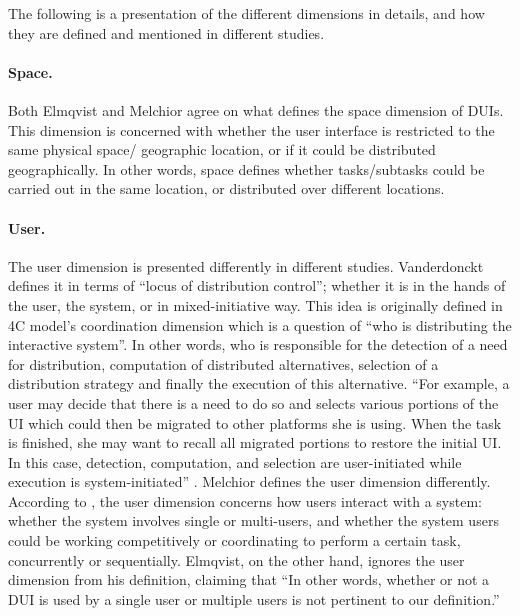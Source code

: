 The following is a presentation of the different dimensions in details, and
how they are defined and mentioned in different studies.
\paragraph{Space.}  Both Elmqvist \cite{elmqvist2011distributed} and Melchior
\cite{melchior2011distributed} agree on what defines the space  dimension of
DUIs. This dimension is concerned with whether the user interface is
restricted to the same physical space/ geographic location, or if it could be
distributed geographically. In other words, space defines whether tasks/subtasks
could be carried out in the same location, or distributed over different
locations. 

\paragraph{User.} The user dimension is presented differently in different
studies. Vanderdonckt \cite{vanderdonckt2010distributed} defines it in terms of 
``locus of distribution control''; whether it is in the hands of the user, the
system, or in mixed-initiative way. This idea is originally defined in 4C
model's coordination dimension which is a question of ``who is distributing the interactive system''\cite{demeure20084c}.
In other words, who is responsible for the detection of a need for distribution,
computation of distributed alternatives, selection of a distribution strategy and
finally the execution of this alternative. ``For example, a user may decide
that there is a need to do so and selects various portions of the UI which could
then be migrated to other platforms she is using. When the task is finished, she
may want to recall all migrated portions to restore the initial UI. In this
case, detection, computation, and selection are user-initiated while execution
is system-initiated'' \cite{demeure20084c}. Melchior defines the user dimension
differently. According to \cite{melchior2011distributed}, the user dimension concerns how users interact
with a system: whether the system involves single or multi-users, and whether
the system users could be working competitively or coordinating to perform a
certain task, concurrently or sequentially. Elmqvist, on the other hand, ignores
the user dimension from his definition, claiming that ``In other words, whether or not a DUI is used by a single user or multiple users is not pertinent to our
definition.''\cite{elmqvist2011distributed}

